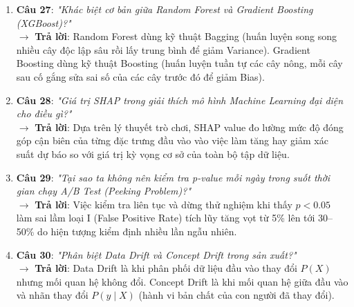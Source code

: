 \begin{enumerate}
    $\rightarrow$ \textbf{Trả lời}: High Bias dẫn đến Underfitting (mô hình quá đơn giản, không học được quy luật). High Variance dẫn đến Overfitting (mô hình quá phức tạp, học vẹt cả nhiễu của tập train nhưng thất bại trên tập test). Mục tiêu là tìm điểm cân bằng cực tiểu hóa tổng sai số.
    \item \textbf{Câu 27}: \textit{"Khác biệt cơ bản giữa Random Forest và Gradient Boosting (XGBoost)?"} \\
    $\rightarrow$ \textbf{Trả lời}: Random Forest dùng kỹ thuật Bagging (huấn luyện song song nhiều cây độc lập sâu rồi lấy trung bình để giảm Variance). Gradient Boosting dùng kỹ thuật Boosting (huấn luyện tuần tự các cây nông, mỗi cây sau cố gắng sửa sai số của các cây trước đó để giảm Bias).
    \item \textbf{Câu 28}: \textit{"Giá trị SHAP trong giải thích mô hình Machine Learning đại diện cho điều gì?"} \\
    $\rightarrow$ \textbf{Trả lời}: Dựa trên lý thuyết trò chơi, SHAP value đo lường mức độ đóng góp cận biên của từng đặc trưng đầu vào vào việc làm tăng hay giảm xác suất dự báo so với giá trị kỳ vọng cơ sở của toàn bộ tập dữ liệu.
    \item \textbf{Câu 29}: \textit{"Tại sao ta không nên kiểm tra p-value mỗi ngày trong suốt thời gian chạy A/B Test (Peeking Problem)?"} \\
    $\rightarrow$ \textbf{Trả lời}: Việc kiểm tra liên tục và dừng thử nghiệm khi thấy $p < 0.05$ làm sai lầm loại I (False Positive Rate) tích lũy tăng vọt từ 5\% lên tới 30--50\% do hiện tượng kiểm định nhiều lần ngẫu nhiên.
    \item \textbf{Câu 30}: \textit{"Phân biệt Data Drift và Concept Drift trong sản xuất?"} \\
    $\rightarrow$ \textbf{Trả lời}: Data Drift là khi phân phối dữ liệu đầu vào thay đổi $P(X)$ nhưng mối quan hệ không đổi. Concept Drift là khi mối quan hệ giữa đầu vào và nhãn thay đổi $P(y \mid X)$ (hành vi bản chất của con người đã thay đổi).
\end{enumerate}

